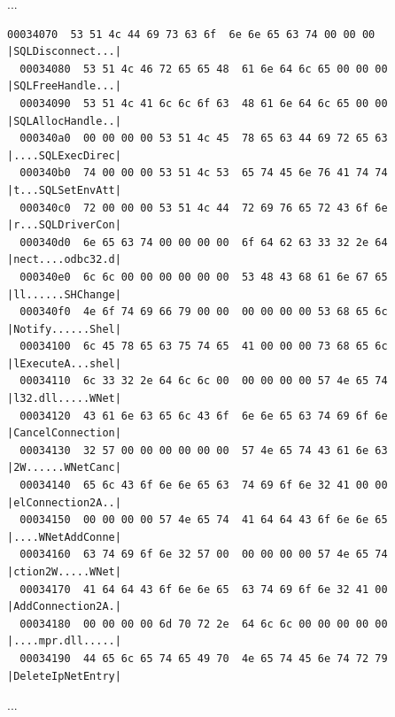 \documentclass[]{project_plan}
\begin{document}
...
\begin{lstlisting}[basicstyle=\tiny]
  00034070  53 51 4c 44 69 73 63 6f  6e 6e 65 63 74 00 00 00  |SQLDisconnect...|
  00034080  53 51 4c 46 72 65 65 48  61 6e 64 6c 65 00 00 00  |SQLFreeHandle...|
  00034090  53 51 4c 41 6c 6c 6f 63  48 61 6e 64 6c 65 00 00  |SQLAllocHandle..|
  000340a0  00 00 00 00 53 51 4c 45  78 65 63 44 69 72 65 63  |....SQLExecDirec|
  000340b0  74 00 00 00 53 51 4c 53  65 74 45 6e 76 41 74 74  |t...SQLSetEnvAtt|
  000340c0  72 00 00 00 53 51 4c 44  72 69 76 65 72 43 6f 6e  |r...SQLDriverCon|
  000340d0  6e 65 63 74 00 00 00 00  6f 64 62 63 33 32 2e 64  |nect....odbc32.d|
  000340e0  6c 6c 00 00 00 00 00 00  53 48 43 68 61 6e 67 65  |ll......SHChange|
  000340f0  4e 6f 74 69 66 79 00 00  00 00 00 00 53 68 65 6c  |Notify......Shel|
  00034100  6c 45 78 65 63 75 74 65  41 00 00 00 73 68 65 6c  |lExecuteA...shel|
  00034110  6c 33 32 2e 64 6c 6c 00  00 00 00 00 57 4e 65 74  |l32.dll.....WNet|
  00034120  43 61 6e 63 65 6c 43 6f  6e 6e 65 63 74 69 6f 6e  |CancelConnection|
  00034130  32 57 00 00 00 00 00 00  57 4e 65 74 43 61 6e 63  |2W......WNetCanc|
  00034140  65 6c 43 6f 6e 6e 65 63  74 69 6f 6e 32 41 00 00  |elConnection2A..|
  00034150  00 00 00 00 57 4e 65 74  41 64 64 43 6f 6e 6e 65  |....WNetAddConne|
  00034160  63 74 69 6f 6e 32 57 00  00 00 00 00 57 4e 65 74  |ction2W.....WNet|
  00034170  41 64 64 43 6f 6e 6e 65  63 74 69 6f 6e 32 41 00  |AddConnection2A.|
  00034180  00 00 00 00 6d 70 72 2e  64 6c 6c 00 00 00 00 00  |....mpr.dll.....|
  00034190  44 65 6c 65 74 65 49 70  4e 65 74 45 6e 74 72 79  |DeleteIpNetEntry|
\end{lstlisting}
...
\end{document}
